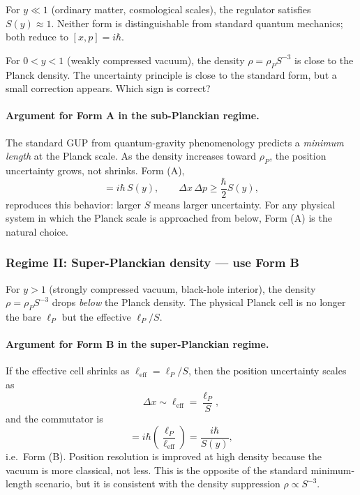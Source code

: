 \documentclass[a4paper,1pt,oneside,openany]{book}
\begin{document}
For $y\ll 1$ (ordinary matter, cosmological scales), the 
regulator satisfies $S(y)\approx 1$. Neither form is 
distinguishable from standard quantum mechanics; both reduce to 
$[x,p]=i\hbar$.

For $0<y<1$ (weakly compressed vacuum), the density 
$\rho=\rho_{P}S^{-3}$ is close to the Planck density. The 
uncertainty principle is close to the standard form, but a 
small correction appears. Which sign is correct?

\paragraph{Argument for Form A in the sub-Planckian regime.}
The standard GUP from quantum-gravity phenomenology predicts a 
\emph{minimum length} at the Planck scale. As the density 
increases toward $\rho_{P}$, the position uncertainty grows, not 
shrinks. Form (A),
\begin{equation}
[x,p]=i\hbar\,S(y),
\qquad
\Delta x\,\Delta p\geq\frac{\hbar}{2}S(y),
\label{eq:FormA-sub}
\end{equation}
reproduces this behavior: larger $S$ means larger uncertainty. 
For any physical system in which the Planck scale is 
approached from below, Form (A) is the natural choice.

\subsubsection{Regime II: Super-Planckian density --- use Form B}

For $y>1$ (strongly compressed vacuum, black-hole interior), 
the density $\rho=\rho_{P}S^{-3}$ drops \emph{below} the Planck 
density. The physical Planck cell is no longer the bare 
$\ell_{P}$ but the effective $\ell_{P}/S$. 

\paragraph{Argument for Form B in the super-Planckian regime.}
If the effective cell shrinks as $\ell_{\text{eff}}=\ell_{P}/S$, 
then the position uncertainty scales as
\begin{equation}
\Delta x\sim\ell_{\text{eff}}=\frac{\ell_{P}}{S},
\label{eq:Dx-B}
\end{equation}
and the commutator is
\begin{equation}
[x,p]=i\hbar\left(\frac{\ell_{P}}{\ell_{\text{eff}}}\right)
=\frac{i\hbar}{S(y)},
\label{eq:FormB-super}
\end{equation}
i.e.\ Form (B). Position resolution is improved at high density 
because the vacuum is more classical, not less. This is the 
opposite of the standard minimum-length scenario, but it is 
consistent with the density suppression $\rho\propto S^{-3}$.
\end{document}
